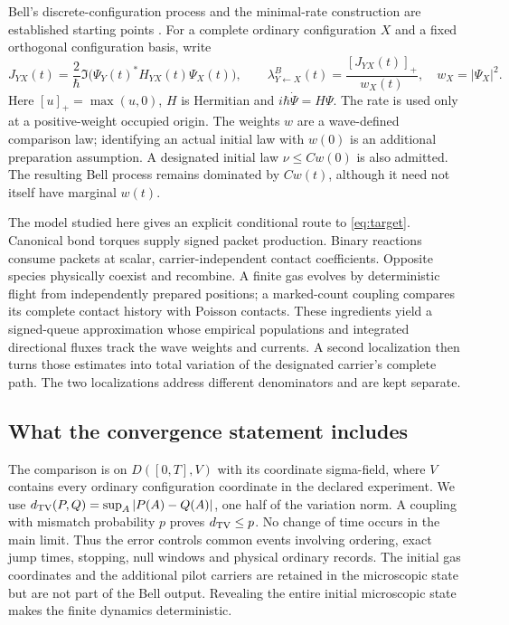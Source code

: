 \documentclass[11pt]{article}
\theoremstyle{definition}\newtheorem{definition}[theorem]{Definition}
\theoremstyle{remark}\newtheorem{remark}[theorem]{Remark}
\begin{document}
Bell's discrete-configuration process and the minimal-rate construction are established starting points \cite{Bell1986,DGTTZ2005,Bell2005}. For a complete ordinary configuration $X$ and a fixed orthogonal configuration basis, write
\begin{equation}
 J_{YX}(t)=\frac{2}{\hbar}\Im\bigl(\Psi_Y(t)^*H_{YX}(t)\Psi_X(t)\bigr),\qquad
 \lambda^B_{Y\leftarrow X}(t)=\frac{[J_{YX}(t)]_+}{w_X(t)},\quad w_X=|\Psi_X|^2.
 \label{eq:target}
\end{equation}
Here $[u]_+=\max(u,0)$, $H$ is Hermitian and $i\hbar\dot\Psi=H\Psi$. The rate is used only at a positive-weight occupied origin. The weights $w$ are a wave-defined comparison law; identifying an actual initial law with $w(0)$ is an additional preparation assumption. A designated initial law $\nu\le Cw(0)$ is also admitted. The resulting Bell process remains dominated by $Cw(t)$, although it need not itself have marginal $w(t)$.

The model studied here gives an explicit conditional route to \eqref{eq:target}. Canonical bond torques supply signed packet production. Binary reactions consume packets at scalar, carrier-independent contact coefficients. Opposite species physically coexist and recombine. A finite gas evolves by deterministic flight from independently prepared positions; a marked-count coupling compares its complete contact history with Poisson contacts. These ingredients yield a signed-queue approximation whose empirical populations and integrated directional fluxes track the wave weights and currents. A second localization then turns those estimates into total variation of the designated carrier's complete path. The two localizations address different denominators and are kept separate.

\subsection{What the convergence statement includes}
The comparison is on $D([0,T],V)$ with its coordinate sigma-field, where $V$ contains every ordinary configuration coordinate in the declared experiment. We use $d_{\mathrm{TV}}(P,Q)=\sup_A|P(A)-Q(A)|$, one half of the variation norm. A coupling with mismatch probability $p$ proves $d_{\mathrm{TV}}\le p$. No change of time occurs in the main limit. Thus the error controls common events involving ordering, exact jump times, stopping, null windows and physical ordinary records. The initial gas coordinates and the additional pilot carriers are retained in the microscopic state but are not part of the Bell output. Revealing the entire initial microscopic state makes the finite dynamics deterministic.
\end{document}
